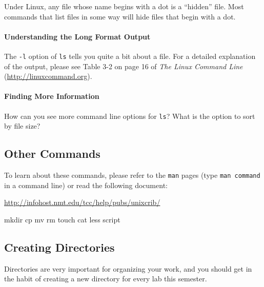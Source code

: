 \documentclass[11pt]{cselabheader}
\begin{document}
Under Linux, any file whose name begins with a dot is a ``hidden'' file. Most
commands that list files in some way will hide files that begin with a dot.

\paragraph*{Understanding the Long Format Output}

The \texttt{-l} option of \texttt{ls} tells you quite a bit about a file. For a
detailed explanation of the output, please see Table 3-2 on page 16 of
\textit{The Linux Command Line} (\url{http://linuxcommand.org}).

\paragraph*{Finding More Information}

How can you see more command line options for \texttt{ls}? What is the option to
sort by file size?

\subsection{Other Commands}

To learn about these commands, please refer to the \texttt{man} pages (type
\texttt{man command} in a command line) or read the following document:
\begin{center}
\url{http://infohost.nmt.edu/tcc/help/pubs/unixcrib/}
\end{center}

\begin{bashcode}
mkdir 
cp
mv
rm
touch
cat
less
script
\end{bashcode}

\subsection{Creating Directories}
Directories are very important for organizing your work, and you should get in
the habit of creating a new directory for every lab this semester.
\end{document}
